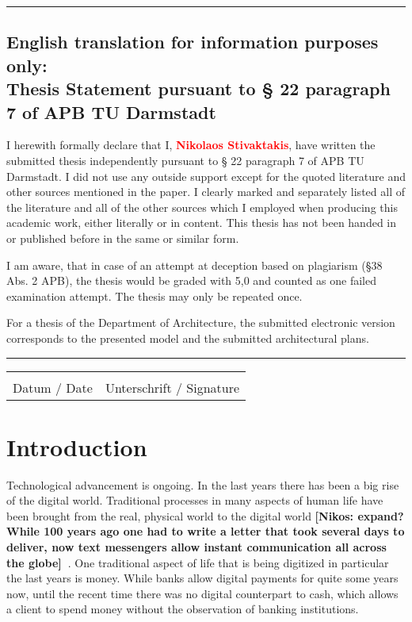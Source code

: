 \documentclass{cacthesis}
\newcommand{\authnote}[3]{{ \footnotesize \textbf{#1[#2: #3]~}}}
\newcommand{\niknote}[1]{\authnote{\color{red}}{Nikos}{#1}}
\begin{document}
	\vspace{10pt}
	\hrule
	
	\section*{English translation for information purposes only:\\Thesis Statement pursuant to § 22 paragraph 7 of APB TU Darmstadt}
	
	I herewith formally declare that I, \textcolor{red}{\textbf{Nikolaos Stivaktakis}}, have written the submitted thesis independently pursuant to § 22 paragraph 7 of APB TU Darmstadt. I did not use any outside support except for the quoted literature and other sources mentioned in the paper. I clearly marked and separately listed all of the literature and all of the other sources which I employed when producing this academic work, either literally or in content. This thesis has not been handed in or published before in the same or similar form.
	
	I am aware, that in case of an attempt at deception based on plagiarism (§38 Abs. 2 APB), the thesis would be graded with 5,0 and counted as one failed examination attempt. The thesis may only be repeated once.
	
	For a thesis of the Department of Architecture, the submitted electronic version corresponds to the presented model and the submitted architectural plans.
	
	\vspace{10pt}
	\hrule
	\vspace{70pt}
	
	\noindent\begin{tabular}{l@{\hskip 1in}l}
		\makebox[1.8in]{\hrulefill} & \makebox[3.5in]{\hrulefill}\\
		Datum / Date & Unterschrift / Signature
	\end{tabular}
	
	\listoffigures
	\listoftables
	\tableofcontents
	
	\mainmatter
	
	\chapter{Introduction}
	Technological advancement is ongoing. In the last years there has been a big rise of the digital world.  Traditional processes in many aspects of human life have been brought from the real, physical world to the digital world \niknote{expand?While 100 years ago one had to write a letter that took several days to deliver, now text messengers allow instant communication all across the globe}. One traditional aspect of life that is being digitized in particular the last years is money. While banks allow digital payments for quite some years now, until the recent time there was no digital counterpart to cash, which allows a client to spend money without the observation of banking institutions.\newline
	
\end{document}
